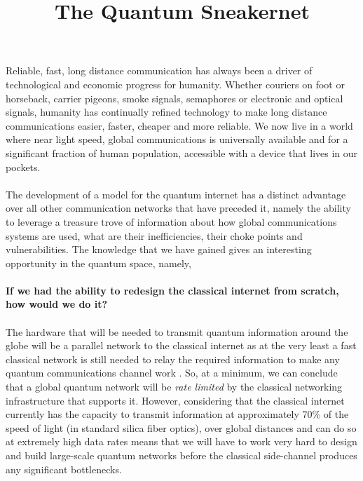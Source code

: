 \documentclass[aps,prl,twocolumn,10pt,nofootinbib]{revtex4}
\begin{document}
\title{The Quantum Sneakernet}


\maketitle

Reliable, fast, long distance communication has always been a driver of technological and economic progress for humanity.  Whether couriers on foot or horseback, carrier pigeons, smoke signals, semaphores or electronic and optical signals, humanity has continually refined technology to make long distance communications easier, faster, cheaper and more reliable.  We now live in a world where near light speed, global communications is universally available and for a significant fraction of human population, accessible with a device that lives in our pockets.  
\\
\\
The development of a model for the quantum internet \cite{?} has a distinct advantage over all other communication networks that have preceded it, namely the ability to leverage a treasure trove of information about how global communications systems are used, what are their inefficiencies, their choke points and vulnerabilities.  The knowledge that we have gained gives an interesting opportunity in the quantum space, namely, 
\\
\\
{\bf If we had the ability to redesign the classical internet from scratch, how would we do it?}
\\
\\
The hardware that will be needed to transmit quantum information around the globe will be a parallel network to the classical internet as at the very least a fast classical network is still needed to relay the required information to make any quantum communications channel work \cite{?}. So, at a minimum, we can conclude that a global quantum network will be {\em rate limited} by the classical networking infrastructure that supports it.  However, considering that the classical internet currently has the capacity to transmit information at approximately 70\% of the speed of light (in standard silica fiber optics), over global distances and can do so at extremely high data rates means that we will have to work very hard to design and build large-scale quantum networks before the classical side-channel produces any significant bottlenecks.  
\end{document}

